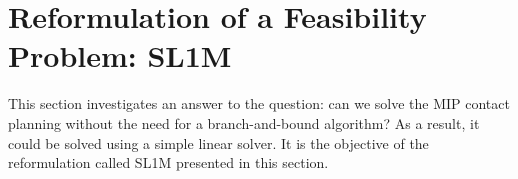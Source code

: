 

\section{Reformulation of a Feasibility Problem: SL1M}
\label{sub:mip:sl1m}

This section investigates an answer to the question: can we solve the MIP contact planning without the need for a branch-and-bound algorithm?
As a result, it could be solved using a simple linear solver.
It is the objective of the reformulation called SL1M \cite{sl1m_v1} presented in this section.

